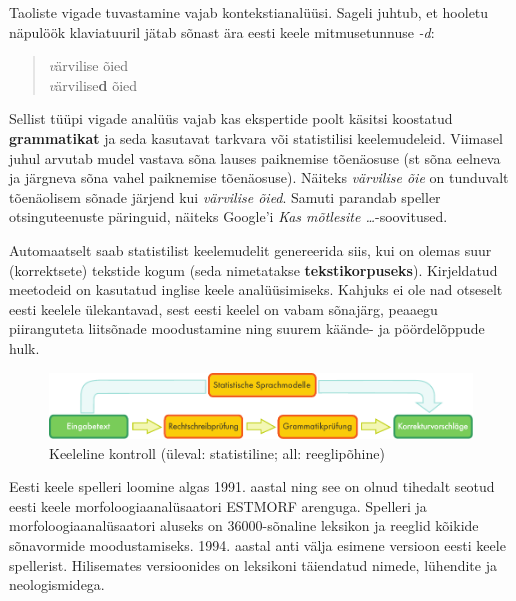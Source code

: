 \documentclass[]{../metanetpaper}
\begin{document}
\begin{multicols}{2}
Taoliste vigade tuvastamine vajab kontekstianalüüsi. 
Sageli juhtub, et hooletu näpulöök klaviatuuril jätab sõnast ära eesti keele mitmusetunnuse \textit{-d}: 

\begin{quote}
 \textit värvilise õied\\ 
 \textit värvilise\textbf{d} õied
\end{quote}

Sellist tüüpi vigade analüüs vajab kas ekspertide poolt käsitsi koostatud \textbf{grammatikat} ja seda kasutavat tarkvara või statistilisi keelemudeleid. 
Viimasel juhul arvutab mudel vastava sõna lauses paiknemise tõenäosuse (st sõna eelneva ja järgneva sõna vahel paiknemise tõenäosuse). 
Näiteks \textit{värvilise õie} on tunduvalt tõenäolisem sõnade järjend kui \textit{värvilise õied}. 
Samuti parandab speller otsinguteenuste päringuid, näiteks Google’i \textit{Kas mõtlesite …}-soovitused.

Automaatselt saab statistilist keelemudelit genereerida siis, kui on olemas suur (korrektsete) tekstide kogum (seda nimetatakse \textbf{tekstikorpuseks}). 
Kirjeldatud meetodeid on kasutatud inglise keele analüüsimiseks. 
Kahjuks ei ole nad otseselt eesti keelele ülekantavad, sest eesti keelel on vabam sõnajärg, peaaegu piiranguteta liitsõnade moodustamine ning suurem käände- ja pöördelõppude hulk. 




\begin{figure}[htb]
  \center
  \includegraphics[width=\textwidth]{../_media/german/language_checking}
  \caption{Keeleline kontroll (üleval: statistiline; all: reeglipõhine)}
  \label{fig:langcheckingaarch_ee}
\end{figure}

Eesti keele spelleri loomine algas 1991. aastal ning see on olnud tihedalt seotud eesti keele morfoloogiaanalüsaatori ESTMORF arenguga. 
Spelleri ja morfoloogiaanalüsaatori aluseks on 36000-sõnaline leksikon ja reeglid kõikide sõnavormide moodustamiseks. 
1994. aastal anti välja esimene versioon eesti keele spellerist. Hilisemates versioonides on leksikoni täiendatud nimede, lühendite ja neologismidega.


\end{multicols}
\end{document}
